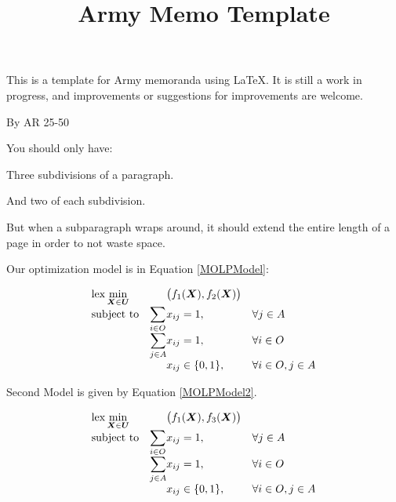 \documentclass{army/armymemo}
\title{Army Memo Template}
\begin{document}
\AMdate{\today}


\AMsethead

\Ni This is a template for Army memoranda using \LaTeX.  It is still a work in progress, and improvements or suggestions for improvements are welcome.

\Nii By AR 25-50

\Niii You should only have:

\Niiii Three subdivisions of a paragraph. 

\Niiii And two of each subdivision.

\Niii But when a subparagraph wraps around, it should extend the entire length of a page in order to not waste space.

\Nii Our optimization model is in Equation \ref{MOLPModel}:

\begin{equation}
\label{MOLPModel}
\begin{array}{ll@{}ll}
\text{lex}\displaystyle \min_{\boldsymbol{X}\in\boldsymbol{U}}  & & \big( f_1(\boldsymbol{X}), f_2(\boldsymbol{X})\big) \\
\text{subject to}& \displaystyle\sum\limits_{i \in O}   &x_{ij} = 1,  &\forall j \in A\\
& \displaystyle\sum\limits_{j \in A} &x_{ij} = 1,  &\forall i \in O\\
& &x_{ij} \in \{0,1\}, &\forall i\in O,j \in A
\end{array}
\end{equation}

\Ni \lipsum[1]

\Nii \lipsum[2]

\Nii \lipsum[3]

\Niii Second Model is given by Equation \ref{MOLPModel2}.

\begin{equation}
\label{MOLPModel2}
\begin{array}{ll@{}ll}
\displaystyle \text{lex}\min_{\boldsymbol{X}\in\boldsymbol{U}}  & & \big ( f_1 (\boldsymbol{X}), f_3(\boldsymbol{X}) \big ) \\
\text{subject to}& \displaystyle\sum\limits_{i \in O}   &x_{ij} = 1,  &\forall j \in A\\
& \displaystyle\sum\limits_{j \in A} &x_{ij} = 1,  &\forall i \in O\\
& &x_{ij} \in \{0,1\}, &\forall i\in O,j \in A
\end{array}
\end{equation}
\end{document}
